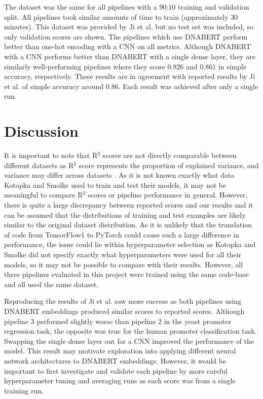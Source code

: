 \documentclass{article}
\begin{document}
The dataset was the same for all pipelines with a $90$:$10$ training and validation split. All pipelines took similar amounts of time to train (approximately 30 minutes). This dataset was provided by Ji et al. \cite{dnabert2020} but no test set was included, so only validation scores are shown. The pipelines which use DNABERT perform better than one-hot encoding with a CNN on all metrics. Although DNABERT with a CNN performs better than DNABERT with a single dense layer, they are similarly well-performing pipelines where they score $0.826$ and $0.861$ in simple accuracy, respectively. These results are in agreement with reported results by Ji et al. \cite{dnabert2020} of simple accuracy around $0.86$. Each result was achieved after only a single run.

\section{Discussion}

It is important to note that R$^2$ scores are not directly comparable between different datasets as R$^2$ score represents the proportion of explained variance, and variance may differ across datasets \cite{scikit-learn}. As it is not known exactly what data Kotopka and Smolke \cite{smolke2020promoter} used to train and test their models, it may not be meaningful to compare R$^2$ scores or pipeline performance in general. However, there is quite a large discrepancy between reported scores and our results and it can be assumed that the distributions of training and test examples are likely similar to the original dataset distribution. As it is unlikely that the translation of code from TensorFlow1 to PyTorch could cause such a large difference in performance, the issue could lie within hyperparameter selection as Kotopka and Smolke \cite{smolke2020promoter} did not specify exactly what hyperparameters were used for all their models, so it may not be possible to compare with their results. However, all three pipelines evaluated in this project were trained using the same code-base and all used the same dataset.

Reproducing the results of Ji et al. \cite{dnabert2020} saw more success as both pipelines using DNABERT embeddings produced similar scores to reported scores. Although pipeline 3 performed slightly worse than pipeline 2 in the yeast promoter regression task, the opposite was true for the human promoter classification task. Swapping the single dense layer out for a CNN improved the performance of the model. This result may motivate exploration into applying different neural network architectures to DNABERT embeddings. However, it would be important to first investigate and validate each pipeline by more careful hyperparameter tuning and averaging runs as each score was from a single training run.
\end{document}
